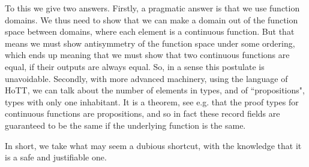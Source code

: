 \documentclass[12pt,a4paper,twoside,openright]{report}
\begin{document}
To this we give two answers. Firstly, a pragmatic answer is that we use function domains. We thus need to show that we can make a domain out of the function space between domains, where each element is a continuous function. But that means we must show antisymmetry of the function space under some ordering, which ends up meaning that we must show that two continuous functions are equal, if their outputs are always equal. So, in a sense this postulate is unavoidable. Secondly, with more advanced machinery, using the language of HoTT, we can talk about the number of elements in types, and of ``propositions", types with only one inhabitant. It is a theorem, see e.g. \cite{De-Jong} that the proof types for continuous functions are propositions, and so in fact these record fields are guaranteed to be the same if the underlying function is the same.

In short, we take what may seem a dubious shortcut, with the knowledge that it is a safe and justifiable one. 
\end{document}

